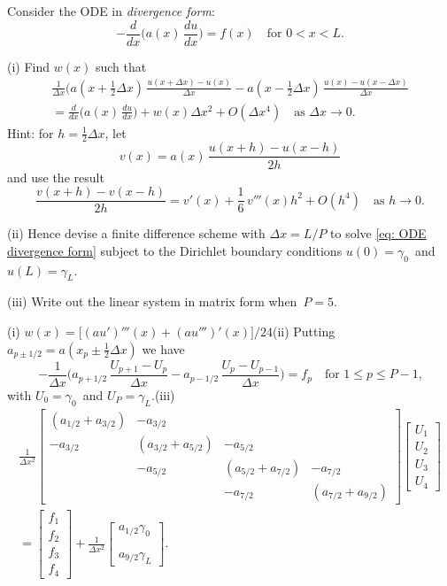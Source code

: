 \begin{Exercises}
\exercise
Consider the ODE in \emph{divergence form}:
\begin{equation}\label{eq: ODE divergence form}
-\frac{d}{dx}\biggl(a(x)\,\frac{du}{dx}\biggr)=f(x)\quad\text{for $0<x<L$.}
\end{equation}
\begin{description}
\item{(i)}
Find $w(x)$ such that
\begin{multline*}
\frac{1}{\Delta x}\biggl(
 a(x+\tfrac12\Delta x)\,\frac{u(x+\Delta x)-u(x)}{\Delta x}
-a(x-\tfrac12\Delta x)\,\frac{u(x)-u(x-\Delta x)}{\Delta x}\\
    =\frac{d}{dx}\biggl(a(x)\,\frac{du}{dx}\biggr)+w(x)\Delta x^2+O(\Delta x^4)
    \quad\text{as $\Delta x\to0$.}
\end{multline*}
Hint: for $h=\tfrac12\Delta x$, let 
\[
v(x)=a(x)\,\frac{u(x+h)-u(x-h)}{2h}
\]
and use the result
\[
\frac{v(x+h)-v(x-h)}{2h}=v'(x)+\frac{1}{6}\,v'''(x)h^2+O(h^4)
    \quad\text{as $h\to0$.}
\]
\item{(ii)} Hence devise a finite difference scheme with $\Delta x=L/P$ to 
solve \eqref{eq: ODE divergence form} subject to the Dirichlet boundary 
conditions $u(0)=\gamma_0$~and $u(L)=\gamma_L$.
\item{(iii)} Write out the linear system in matrix form when~$P=5$.
\end{description}
\begin{ans}
(i) $w(x)=\bigl[(au')'''(x)+(au''')'(x)\bigr]/24$\quad (ii) Putting
$a_{p\pm1/2}=a(x_p\pm\tfrac12\Delta x)$ we have
\[
-\frac{1}{\Delta x}\biggl(a_{p+1/2}\,\frac{U_{p+1}-U_p}{\Delta x}
    -a_{p-1/2}\,\frac{U_p-U_{p-1}}{\Delta x}\biggr)=f_p
    \quad\text{for $1\le p\le P-1$,}
\]
with $U_0=\gamma_0$~and $U_P=\gamma_L$.\quad (iii)
\begin{multline*}
\frac{1}{\Delta x^2}\begin{bmatrix}
            (a_{1/2}+a_{3/2})&-a_{3/2}&&\\
   -a_{3/2}&(a_{3/2}+a_{5/2})&-a_{5/2}&\\
  &-a_{5/2}&(a_{5/2}+a_{7/2})&-a_{7/2}\\
 &&-a_{7/2}&(a_{7/2}+a_{9/2})
\end{bmatrix}
\begin{bmatrix}U_1\\ U_2\\ U_3\\ U_4\end{bmatrix}\\
=\begin{bmatrix}f_1\\ f_2\\ f_3\\ f_4 \end{bmatrix}+\frac{1}{\Delta x^2}
\begin{bmatrix}a_{1/2}\gamma_0\\ \\ \\ a_{9/2}\gamma_L \end{bmatrix}.
\end{multline*}
\end{ans}

\end{Exercises}
